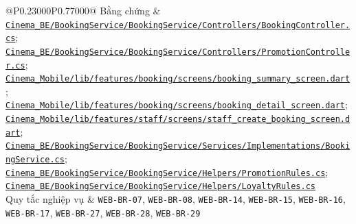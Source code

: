 \begin{longtable}{@{}P{0.23000\SRSWidth}P{0.77000\SRSWidth}@{}}
Bằng chứng & \href{../../../Cinema\_BE/BookingService/BookingService/Controllers/BookingController.cs}{\texttt{Cinema\_\allowbreak{}BE/\allowbreak{}Booking\allowbreak{}Service/\allowbreak{}Booking\allowbreak{}Service/\allowbreak{}Controll\allowbreak{}ers/\allowbreak{}Booking\allowbreak{}Controll\allowbreak{}er.\allowbreak{}cs}}; \href{../../../Cinema\_BE/BookingService/BookingService/Controllers/PromotionController.cs}{\texttt{Cinema\_\allowbreak{}BE/\allowbreak{}Booking\allowbreak{}Service/\allowbreak{}Booking\allowbreak{}Service/\allowbreak{}Controll\allowbreak{}ers/\allowbreak{}Promotio\allowbreak{}n\allowbreak{}Controll\allowbreak{}er.\allowbreak{}cs}}; \href{../../../Cinema\_Mobile/lib/features/booking/screens/booking\_summary\_screen.dart}{\texttt{Cinema\_\allowbreak{}Mobile/\allowbreak{}lib/\allowbreak{}features\allowbreak{}/\allowbreak{}booking/\allowbreak{}screens/\allowbreak{}booking\_\allowbreak{}summary\_\allowbreak{}screen.\allowbreak{}dart}}; \href{../../../Cinema\_Mobile/lib/features/booking/screens/booking\_detail\_screen.dart}{\texttt{Cinema\_\allowbreak{}Mobile/\allowbreak{}lib/\allowbreak{}features\allowbreak{}/\allowbreak{}booking/\allowbreak{}screens/\allowbreak{}booking\_\allowbreak{}detail\_\allowbreak{}screen.\allowbreak{}dart}}; \href{../../../Cinema\_Mobile/lib/features/staff/screens/staff\_create\_booking\_screen.dart}{\texttt{Cinema\_\allowbreak{}Mobile/\allowbreak{}lib/\allowbreak{}features\allowbreak{}/\allowbreak{}staff/\allowbreak{}screens/\allowbreak{}staff\_\allowbreak{}create\_\allowbreak{}booking\_\allowbreak{}screen.\allowbreak{}dart}}; \href{../../../Cinema\_BE/BookingService/BookingService/Services/Implementations/BookingService.cs}{\texttt{Cinema\_\allowbreak{}BE/\allowbreak{}Booking\allowbreak{}Service/\allowbreak{}Booking\allowbreak{}Service/\allowbreak{}Services\allowbreak{}/\allowbreak{}Implemen\allowbreak{}tations/\allowbreak{}Booking\allowbreak{}Service.\allowbreak{}cs}}; \href{../../../Cinema\_BE/BookingService/BookingService/Helpers/PromotionRules.cs}{\texttt{Cinema\_\allowbreak{}BE/\allowbreak{}Booking\allowbreak{}Service/\allowbreak{}Booking\allowbreak{}Service/\allowbreak{}Helpers/\allowbreak{}Promotio\allowbreak{}n\allowbreak{}Rules.\allowbreak{}cs}}; \href{../../../Cinema\_BE/BookingService/BookingService/Helpers/LoyaltyRules.cs}{\texttt{Cinema\_\allowbreak{}BE/\allowbreak{}Booking\allowbreak{}Service/\allowbreak{}Booking\allowbreak{}Service/\allowbreak{}Helpers/\allowbreak{}Loyalty\allowbreak{}Rules.\allowbreak{}cs}} \\[3pt]
Quy tắc nghiệp vụ & \texttt{WEB-\allowbreak{}BR-\allowbreak{}07}, \texttt{WEB-\allowbreak{}BR-\allowbreak{}08}, \texttt{WEB-\allowbreak{}BR-\allowbreak{}14}, \texttt{WEB-\allowbreak{}BR-\allowbreak{}15}, \texttt{WEB-\allowbreak{}BR-\allowbreak{}16}, \texttt{WEB-\allowbreak{}BR-\allowbreak{}17}, \texttt{WEB-\allowbreak{}BR-\allowbreak{}27}, \texttt{WEB-\allowbreak{}BR-\allowbreak{}28}, \texttt{WEB-\allowbreak{}BR-\allowbreak{}29} \\[3pt]

\end{longtable}
